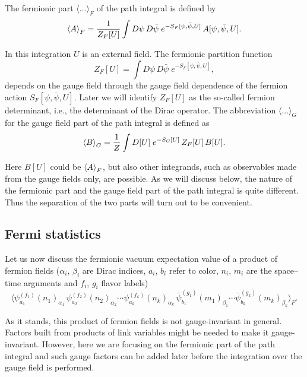 The fermionic part $\langle\ldots\rangle_F$ of the path integral is defined by
\begin{equation}
  \left\langle A \right\rangle_F =
    \frac{1}{Z_F[U]}\int D\psi\,D\bar{\psi}\;
    e^{-S_F[\psi,\bar{\psi},U]}\,A[\psi,\bar{\psi},U] .
\end{equation}

In this integration $U$ is an external field. The fermionic partition function
\begin{equation}
  Z_F[U] = \int D\psi\,D\bar{\psi}\; e^{-S_F[\psi,\bar{\psi},U]} ,
\end{equation}
depends on the gauge field through the gauge field dependence of the fermion
action $S_F[\psi,\bar{\psi},U]$. Later we will identify $Z_F[U]$ as the so-called fermion determinant, i.e., the determinant of the Dirac operator. The abbreviation $\langle\ldots\rangle_G$
for the gauge field part of the path integral is defined as
\begin{equation}
  \left\langle B \right\rangle_G = \frac{1}{Z}\int D[U]\; e^{-S_G[U]}\,Z_F[U]\,B[U] .
\end{equation}

Here $B[U]$ could be $\left\langle A \right\rangle_F$, but also other integrands, such as observables made
from the gauge fields only, are possible. As we will discuss below, the nature
of the fermionic part and the gauge field part of the path integral is quite
different. Thus the separation of the two parts will turn out to be convenient.

\subsection{Fermi statistics}

Let us now discuss the fermionic vacuum expectation value of a product of
fermion fields ($\alpha_i$, $\beta_i$ are Dirac indices, $a_i$, $b_i$ refer to color, $n_i$, $m_i$ are the
space--time arguments and $f_i$, $g_i$ flavor labels)
\begin{equation}
  \Big\langle
    \psi^{(f_1)}_{a_1}(n_1)_{\alpha_1}\,
    \psi^{(f_2)}_{a_2}(n_2)_{\alpha_2}\cdots
    \psi^{(f_k)}_{a_k}(n_k)_{\alpha_k}\,
    \bar{\psi}^{(g_1)}_{b_1}(m_1)_{\beta_1}\cdots
    \bar{\psi}^{(g_k)}_{b_k}(m_k)_{\beta_k}
  \Big\rangle_F .
\end{equation}

As it stands, this product of fermion fields is not gauge-invariant in general.
Factors built from products of link variables might be needed to make it
gauge-invariant. However, here we are focusing on the fermionic part of the
path integral and such gauge factors can be added later before the integration
over the gauge field is performed.

